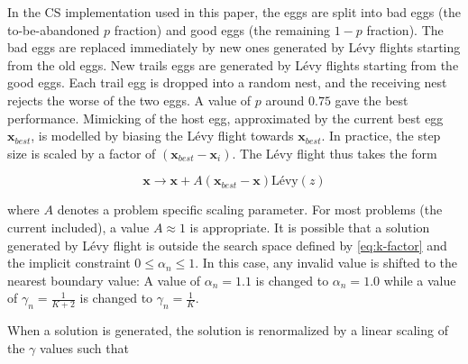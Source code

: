 \documentclass[a4paper, 12pt, sort&compress]{elsarticle}%
\newcommand{\paren}[1]{\left(#1\right)}
\begin{document}

In the CS implementation used in this paper, the eggs are split into
bad eggs (the to-be-abandoned $p$ fraction) and good eggs (the
remaining $1-p$ fraction). The bad eggs are replaced immediately by
new ones generated by Lévy flights starting from the old eggs. New
trails eggs are generated by Lévy flights starting from the good
eggs. Each trail egg is dropped into a random nest, and the receiving
nest rejects the worse of the two eggs. A value of $p$ around $0.75$
gave the best performance. Mimicking of the host egg, approximated by
the current best egg $\boldsymbol x_{best}$, is modelled by biasing
the Lévy flight towards $\boldsymbol x_{best}$. In practice, the step
size is scaled by a factor of
$\paren{\boldsymbol x_{best}- \boldsymbol x_{i}}$. The Lévy flight
thus takes the form

\begin{equation}
  \label{eq:1}
  \boldsymbol x \to \boldsymbol x + A \paren{\boldsymbol x_{best}- \boldsymbol x} \mbox{Lévy}(z) 
\end{equation}

where $A$ denotes a problem specific scaling parameter. For most
problems (the current included), a value $A \approx 1$ is appropriate. It is
possible that a solution generated by Lévy flight is outside the
search space defined by \cref{eq:k-factor} and the implicit constraint
$0 \leq \alpha_{n} \leq 1$. In this case, any invalid value is shifted to
the nearest boundary value: A value of $\alpha_{n} = 1.1$ is changed to
$\alpha_{n} = 1.0$ while a value of $\gamma_{n} = \frac{1}{K+2}$ is changed to
$\gamma_{n} = \frac{1}{K}$.

% 
% 

When a solution is generated, the solution is renormalized by a linear
scaling of the $\gamma$ values such that
\end{document}

